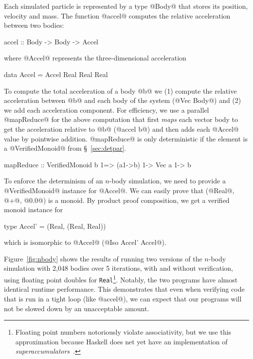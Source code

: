 Each simulated particle is represented by a
type @Body@ that stores its position, velocity and mass.
%
The function @accel@ computes the relative acceleration
between two bodies:
\begin{mcode}
  accel :: Body -> Body -> Accel
\end{mcode}
where @Accel@ represents the three-dimensional acceleration
\begin{mcode}
  data Accel = Accel Real Real Real
\end{mcode}
%
To compute the total acceleration
of a body @b@ we
(1) compute the relative acceleration between @b@
and each body of the system (@Vec Body@) and
(2) we add each acceleration component.
%
For efficiency, we use a parallel @mapReduce@ for the above
computation that
first \textit{maps} each vector body to get the acceleration relative to @b@
(@accel b@) and then adds each @Accel@ value by pointwise addition.
%
@mapReduce@ is only deterministic if the element is a @VerifiedMonoid@
from \S~\ref{sec:detpar}.
\begin{mcode}
mapReduce :: VerifiedMonoid b 1=> (a1->b) 1-> Vec a 1-> b
\end{mcode}
%
To enforce the determinism of an $n$-body simulation, we need to provide a
@VerifiedMonoid@ instance for @Accel@.
%
We can easily prove that (@Real@, @+@, @0.0@)
is a monoid.
%
By product proof composition, we get a verified monoid instance for
\begin{mcode}
  type Accel' = (Real, (Real, Real))
\end{mcode}
which is isomorphic to @Accel@ (\ie @Iso Accel' Accel@).

Figure~\ref{fig:nbody} shows the results of running two versions of the $n$-body
simulation with 2,048 bodies over 5 iterations, with and without verification,
using floating point doubles for \texttt{Real}\footnote{Floating point numbers
  notoriously violate associativity, but we use this approximation because
  Haskell does net yet have an implementation of {\em
    superaccumulators}~\cite{superaccumulation}.}. Notably, the two programs have almost
identical runtime performance.  This demonstrates that even when verifying code
that is run in a tight loop (like @accel@), we can expect that our programs
will not be slowed down by an unacceptable amount.


